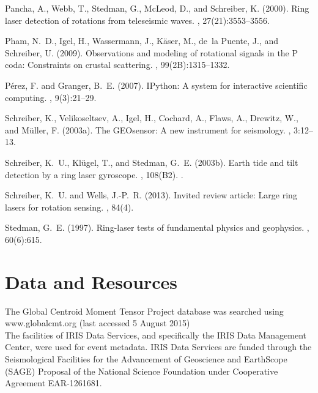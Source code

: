 \documentclass[12pt,reqno,letter]{article}
\begin{document}
\begin{thebibliography}{}
Pancha, A., Webb, T., Stedman, G., McLeod, D., and Schreiber, K. (2000).
\newblock Ring laser detection of rotations from teleseismic waves.
, 27(21):3553--3556.

Pham, N.~D., Igel, H., Wassermann, J., Käser, M., de~la Puente, J., and
  Schreiber, U. (2009).
\newblock Observations and modeling of rotational signals in the {P} coda:
  Constraints on crustal scattering.
,
  99(2B):1315--1332.

Pérez, F. and Granger, B.~E. (2007).
\newblock I{P}ython: A system for interactive scientific computing.
, 9(3):21--29.

Schreiber, K., Velikoseltsev, A., Igel, H., Cochard, A., Flaws, A., Drewitz,
  W., and M{\"u}ller, F. (2003a).
\newblock The {GEO}sensor: A new instrument for seismology.
, 3:12--13.

Schreiber, K.~U., Klügel, T., and Stedman, G.~E. (2003b).
\newblock Earth tide and tilt detection by a ring laser gyroscope.
, 108(B2).
.

Schreiber, K.~U. and Wells, J.-P.~R. (2013).
\newblock Invited review article: Large ring lasers for rotation sensing.
, 84(4).

Stedman, G.~E. (1997).
\newblock Ring-laser tests of fundamental physics and geophysics.
, 60(6):615.

\end{thebibliography}


\newpage

\section*{Data and Resources}
The Global Centroid Moment Tensor Project database was searched using www.globalcmt.org (last accessed 5 August 2015)\\

\noindent
The facilities of IRIS Data Services, and specifically the IRIS Data Management Center, were used for event metadata. IRIS Data Services are funded through the Seismological Facilities for the Advancement of Geoscience and EarthScope (SAGE) Proposal of the National Science Foundation under Cooperative Agreement EAR-1261681.
\end{document}
